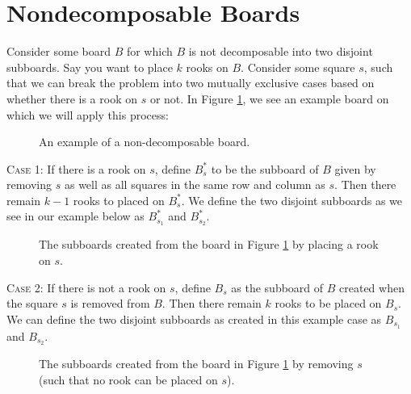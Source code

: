 \documentclass{article}
\newcommand{\w}{0.5}
\newcommand{\ww}{0.25}
\newcommand{\places}[2]{\draw (#1*\w cm - \ww cm, #2*\w cm - \ww cm) node {$s$};}
\newcommand{\placelabel}[3]{\draw (#1*\w cm - \ww cm, #2*\w cm - \ww cm) node {#3};}
\newcommand{\shadesquare}[2]{\filldraw[fill=gray!40!white, draw=black] (#1*\w - \w,#2*\w - \w) rectangle (#1*\w,#2*\w);}
\newcommand{\unshadesquare}[2]{\filldraw[fill=white, draw=black] (#1*\w - \w,#2*\w - \w) rectangle (#1*\w,#2*\w);}
\begin{document}
\section{Nondecomposable Boards} \label{nondecomposable}
Consider some board $B$ for which $B$ is not decomposable into two disjoint subboards. Say you want to place $k$ rooks on $B$. Consider some square $s$, such that we can break the problem into two mutually exclusive cases based on whether there is a rook on $s$ or not. In Figure \ref{nondecomposable}, we see an example board on which we will apply this process:

\begin{figure}[!h]
    \centering
    \caption{An example of a non-decomposable board.}
    \label{nondecomposable}
\end{figure}

\textsc{Case 1:} If there is a rook on $s$, define $B_{s}^*$ to be the subboard of $B$ given by removing $s$ as well as all squares in the same row and column as $s$. Then there remain $k-1$ rooks to placed on $B_{s}^*$.  We define the two disjoint subboards as we see in our example below as $B_{s_1}^*$ and $B_{s_2}^*$.

\pagebreak
\begin{figure}[!h]
    \centering
    \caption{The subboards created from the board in Figure \ref{nondecomposable} by placing a rook on $s$.}
    \label{case1}
\end{figure}

\textsc{Case 2:} If there is not a rook on $s$, define $B_s$ as the subboard of $B$ created when the square $s$ is removed from $B$. Then there remain $k$ rooks to be placed on $B_s$. We can define the two disjoint subboards as created in this example case as $B_{s_1}$ and $B_{s_2}$.

\begin{figure}[!h]
    \centering
    \caption{The subboards created from the board in Figure \ref{nondecomposable} by removing $s$ (such that no rook can be placed on $s$).}
    \label{case2}
\end{figure}
\end{document}
